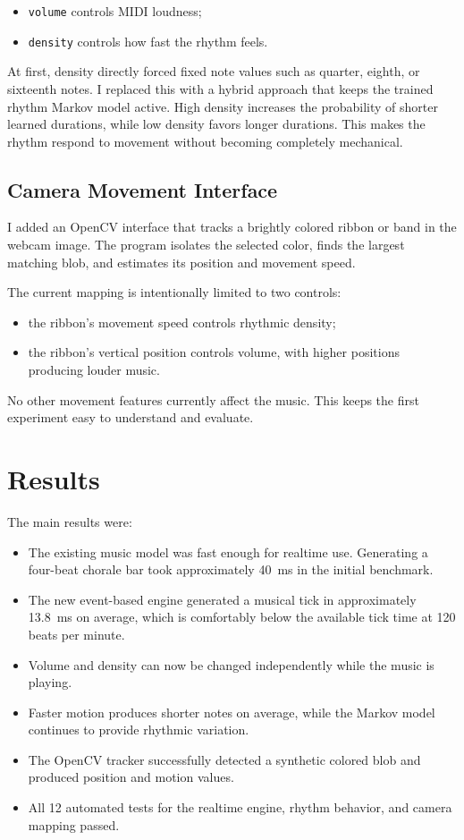 \documentclass[11pt,a4paper]{article}
\begin{document}
\begin{itemize}
    \item \texttt{volume} controls MIDI loudness;
    \item \texttt{density} controls how fast the rhythm feels.
\end{itemize}

At first, density directly forced fixed note values such as quarter, eighth,
or sixteenth notes. I replaced this with a hybrid approach that keeps the
trained rhythm Markov model active. High density increases the probability of
shorter learned durations, while low density favors longer durations. This
makes the rhythm respond to movement without becoming completely mechanical.

\subsection{Camera Movement Interface}

I added an OpenCV interface that tracks a brightly colored ribbon or band in
the webcam image. The program isolates the selected color, finds the largest
matching blob, and estimates its position and movement speed.

The current mapping is intentionally limited to two controls:

\begin{itemize}
    \item the ribbon's movement speed controls rhythmic density;
    \item the ribbon's vertical position controls volume, with higher positions
    producing louder music.
\end{itemize}

No other movement features currently affect the music. This keeps the first
experiment easy to understand and evaluate.

\section{Results}

The main results were:

\begin{itemize}
    \item The existing music model was fast enough for realtime use. Generating
    a four-beat chorale bar took approximately 40~ms in the initial benchmark.
    \item The new event-based engine generated a musical tick in approximately
    13.8~ms on average, which is comfortably below the available tick time at
    120 beats per minute.
    \item Volume and density can now be changed independently while the music
    is playing.
    \item Faster motion produces shorter notes on average, while the Markov
    model continues to provide rhythmic variation.
    \item The OpenCV tracker successfully detected a synthetic colored blob and
    produced position and motion values.
    \item All 12 automated tests for the realtime engine, rhythm behavior, and
    camera mapping passed.
\end{itemize}
\end{document}
